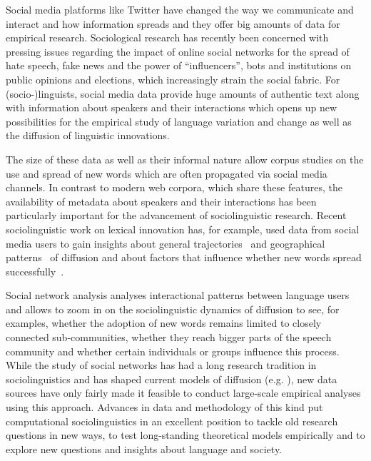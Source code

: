 \documentclass[a4paper]{scrartcl}
\begin{document}
  Social media platforms like Twitter have changed the way we communicate and interact and how information spreads and they offer big amounts of data for empirical research. Sociological research has recently been concerned with pressing issues regarding the impact of online social networks for the spread of hate speech, fake news and the power of \enquote{influencers}, bots and institutions on public opinions and elections, which increasingly strain the social fabric. For (socio-)linguists, social media data provide huge amounts of authentic text along with information about speakers and their interactions which opens up new possibilities for the empirical study of language variation and change as well as the diffusion of linguistic innovations.


  The size of these data as well as their informal nature allow corpus studies on the use and spread of new words which are often propagated via social media channels. In contrast to modern web corpora, which share these features, the availability of metadata about speakers and their interactions has been particularly important for the advancement of sociolinguistic research. Recent sociolinguistic work on lexical innovation has, for example, used data from social media users to gain insights about general trajectories~\parencite{Nini2017} and geographical patterns~\parencite{Eisenstein2014,Grieve2017,Grieve2018} of diffusion and about factors that influence whether new words spread successfully~\parencite{Grieveforthcoming}.

  Social network analysis analyses interactional patterns between language users and allows to zoom in on the sociolinguistic dynamics of diffusion to see, for examples, whether the adoption of new words remains limited to closely connected sub-communities, whether they reach bigger parts of the speech community and whether certain individuals or groups influence this process. While the study of social networks has had a long research tradition in sociolinguistics and has shaped current models of diffusion (e.g. \cite{Milroy1985}), new data sources have only fairly made it feasible to conduct large-scale empirical analyses using this approach. Advances in data and methodology of this kind put computational sociolinguistics in an excellent position to tackle old research questions in new ways, to test long-standing theoretical models empirically and to explore new questions and insights about language and society.
\end{document}
